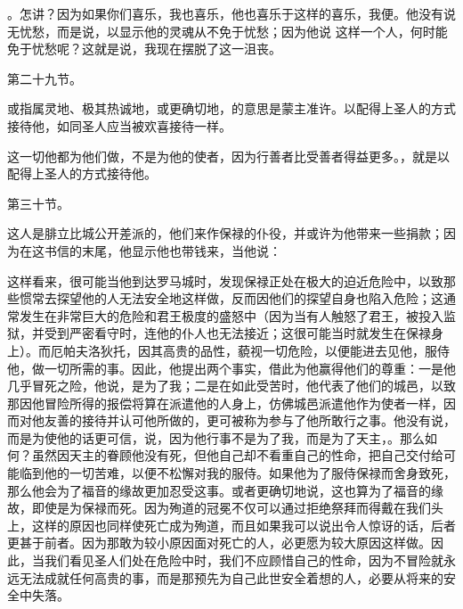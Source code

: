 。怎讲？因为如果你们喜乐，我也喜乐，他也喜乐于这样的喜乐，我便。他没有说无忧愁，而是说，以显示他的灵魂从不免于忧愁；因为他说 这样一个人，何时能免于忧愁呢？这就是说，我现在摆脱了这一沮丧。\par

第二十九节。 \par

或指属灵地、极其热诚地，或更确切地，的意思是蒙主准许。以配得上圣人的方式接待他，如同圣人应当被欢喜接待一样。\par

这一切他都为他们做，不是为他的使者，因为行善者比受善者得益更多。，就是以配得上圣人的方式接待他。\par

第三十节。 \par

这人是腓立比城公开差派的，他们来作保禄的仆役，并或许为他带来一些捐款；因为在这书信的末尾，他显示他也带钱来，当他说： \par

这样看来，很可能当他到达罗马城时，发现保禄正处在极大的迫近危险中，以致那些惯常去探望他的人无法安全地这样做，反而因他们的探望自身也陷入危险；这通常发生在非常巨大的危险和君王极度的盛怒中（因为当有人触怒了君王，被投入监狱，并受到严密看守时，连他的仆人也无法接近；这很可能当时就发生在保禄身上）。而厄帕夫洛狄托，因其高贵的品性，藐视一切危险，以便能进去见他，服侍他，做一切所需的事。因此，他提出两个事实，借此为他赢得他们的尊重：一是他几乎冒死之险，他说，是为了我；二是在如此受苦时，他代表了他们的城邑，以致那因他冒险所得的报偿将算在派遣他的人身上，仿佛城邑派遣他作为使者一样，因而对他友善的接待并认可他所做的，更可被称为参与了他所敢行之事。他没有说，而是为使他的话更可信，说，因为他行事不是为了我，而是为了天主，。那么如何？虽然因天主的眷顾他没有死，但他自己却不看重自己的性命，把自己交付给可能临到他的一切苦难，以便不松懈对我的服侍。如果他为了服侍保禄而舍身致死，那么他会为了福音的缘故更加忍受这事。或者更确切地说，这也算为了福音的缘故，即使是为保禄而死。因为殉道的冠冕不仅可以通过拒绝祭拜而得戴在我们头上，这样的原因也同样使死亡成为殉道，而且如果我可以说出令人惊讶的话，后者更甚于前者。因为那敢为较小原因面对死亡的人，必更愿为较大原因这样做。因此，当我们看见圣人们处在危险中时，我们不应顾惜自己的性命，因为不冒险就永远无法成就任何高贵的事，而是那预先为自己此世安全着想的人，必要从将来的安全中失落。\par

